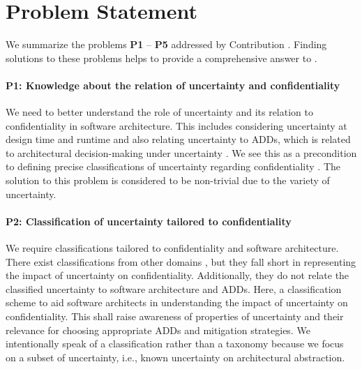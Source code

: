 




\section{Problem Statement}%
\label{sec:classification:problem}

We summarize the problems \textbf{P1} -- \textbf{P5} addressed by Contribution .
Finding solutions to these problems helps to provide a comprehensive answer to .

\paragraph{P1: Knowledge about the relation of uncertainty and confidentiality}\label{p:1:1}
We need to better understand the role of uncertainty and its relation to confidentiality in software architecture.
This includes considering uncertainty at design time and runtime and also relating uncertainty to \acfp{ADD}, which is related to architectural decision-making under uncertainty \cite{lytra_supporting_2013}.
We see this as a precondition to defining precise classifications of uncertainty regarding confidentiality \cite{hahner_dealing_2021}.
The solution to this problem is considered to be non-trivial due to the variety of uncertainty.

\paragraph{P2: Classification of uncertainty tailored to confidentiality}\label{p:1:2}
We require classifications tailored to confidentiality and software architecture.
There exist classifications from other domains \cite{perez-palacin_uncertainties_2014,ramirez_taxonomy_2012,walker_defining_2003}, but they fall short in representing the impact of uncertainty on confidentiality.
Additionally, they do not relate the classified uncertainty to software architecture and \acp{ADD}.
Here, a classification scheme to aid software architects in understanding the impact of uncertainty on confidentiality. 
This shall raise awareness of properties of uncertainty and their relevance for choosing appropriate \acp{ADD} and mitigation strategies. 
We intentionally speak of a classification rather than a taxonomy because we focus on a subset of uncertainty, i.e., known uncertainty on architectural abstraction.

